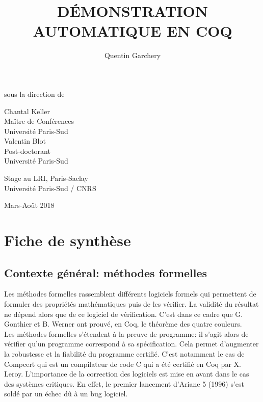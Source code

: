 \documentclass[11pt]{article}
\title{ {\Large \textbf{DÉMONSTRATION AUTOMATIQUE EN COQ}} }
\date{}
\author{Quentin Garchery}
\begin{document}
\maketitle
\thispagestyle{empty}

\begin{center}
\normalsize sous la direction de \\

\vspace{3mm}

\begin{multicols}{2}
\large Chantal Keller \\
Maître de Conférences\\
Université Paris-Sud \\

\large Valentin Blot \\
Post-doctorant\\
Université Paris-Sud
\end{multicols}

\vspace{7mm}

\Large{Stage au LRI, Paris-Saclay\\
Université Paris-Sud / CNRS \\}

\vspace{5mm}

\normalsize Mars-Août 2018

\end{center}


\vspace{2cm}


\section{Fiche de synthèse}

\subsection{Contexte général: méthodes formelles}

Les méthodes formelles rassemblent différents logiciels formels qui permettent de formuler des propriétés mathématiques puis de les vérifier. La validité du résultat ne dépend alors que de ce logiciel de vérification. C'est dans ce cadre que G. Gonthier et B. Werner ont prouvé, en Coq, le théorème des quatre couleurs.\\

Les méthodes formelles s'étendent à la preuve de programme: il s'agit alors de vérifier qu'un programme correspond à sa spécification. Cela permet d'augmenter la robustesse et la fiabilité du programme certifié. C'est notamment le cas de Compcert \cite{compcert} qui est un compilateur de code C qui a été certifié en Coq par X. Leroy. L'importance de la correction des logiciels est mise en avant dans le cas des systèmes critiques. En effet, le premier lancement d'Ariane 5 (1996) s'est soldé par un échec dû à un bug logiciel. 
\end{document}
